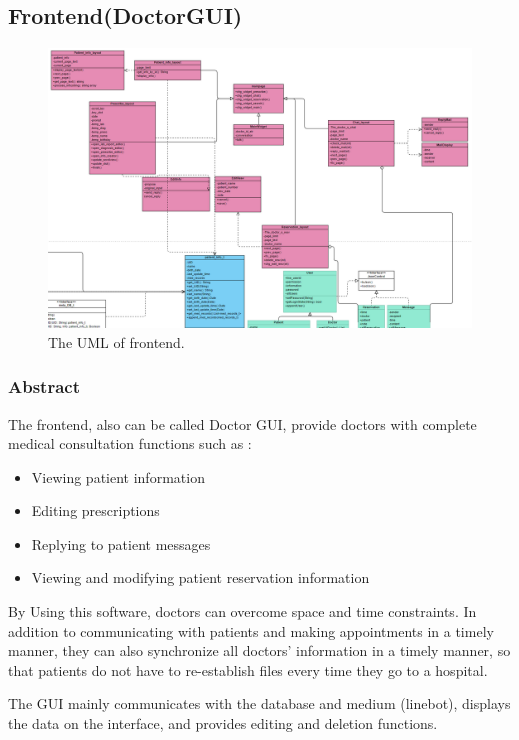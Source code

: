 \documentclass{article}
\begin{document}
\subsection*{Frontend(DoctorGUI)}

\begin{figure}[h]
    \centering
    \includegraphics[scale = 0.5]{asset/doctor_gui/frontend_uml.png}
    \caption{The UML of frontend.}
    \label{fig:frontend_uml}
  \end{figure}

\subsubsection*{Abstract}
The frontend, also can be called Doctor GUI, provide doctors with complete medical consultation functions such as :

\begin{itemize}
    \item Viewing patient information
    \item Editing prescriptions
    \item Replying to patient messages
    \item Viewing and modifying patient reservation information
\end{itemize}

By Using this software, doctors can overcome space and time constraints. In addition to communicating with patients and making appointments in a timely manner, they can also synchronize all doctors' information in a timely manner, so that patients do not have to re-establish files every time they go to a hospital.

The GUI mainly communicates with the database and medium (linebot), displays the data on the interface, and provides editing and deletion functions. 
\end{document}

